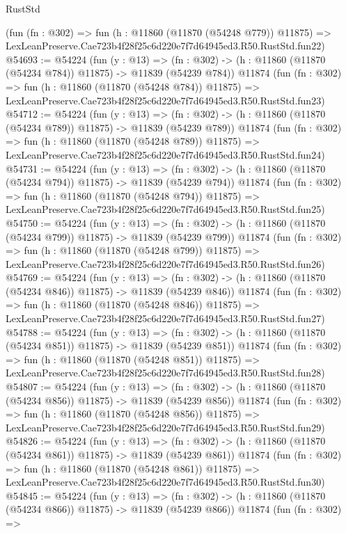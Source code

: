 \begin{lexlean}{RustStd}
\begin{coremodule}
    (fun (fn : @302) =>
    fun (h : @11860 (@11870 (@54248 @779)) @11875) =>
    LexLeanPreserve.Cae723b4f28f25c6d220e7f7d64945ed3.R50.RustStd.fun22)
@54693 := @54224
    (fun (y : @13) =>
    (fn : @302) -> (h : @11860 (@11870 (@54234 @784)) @11875) -> @11839 (@54239 @784))
    @11874
    (fun (fn : @302) =>
    fun (h : @11860 (@11870 (@54248 @784)) @11875) =>
    LexLeanPreserve.Cae723b4f28f25c6d220e7f7d64945ed3.R50.RustStd.fun23)
@54712 := @54224
    (fun (y : @13) =>
    (fn : @302) -> (h : @11860 (@11870 (@54234 @789)) @11875) -> @11839 (@54239 @789))
    @11874
    (fun (fn : @302) =>
    fun (h : @11860 (@11870 (@54248 @789)) @11875) =>
    LexLeanPreserve.Cae723b4f28f25c6d220e7f7d64945ed3.R50.RustStd.fun24)
@54731 := @54224
    (fun (y : @13) =>
    (fn : @302) -> (h : @11860 (@11870 (@54234 @794)) @11875) -> @11839 (@54239 @794))
    @11874
    (fun (fn : @302) =>
    fun (h : @11860 (@11870 (@54248 @794)) @11875) =>
    LexLeanPreserve.Cae723b4f28f25c6d220e7f7d64945ed3.R50.RustStd.fun25)
@54750 := @54224
    (fun (y : @13) =>
    (fn : @302) -> (h : @11860 (@11870 (@54234 @799)) @11875) -> @11839 (@54239 @799))
    @11874
    (fun (fn : @302) =>
    fun (h : @11860 (@11870 (@54248 @799)) @11875) =>
    LexLeanPreserve.Cae723b4f28f25c6d220e7f7d64945ed3.R50.RustStd.fun26)
@54769 := @54224
    (fun (y : @13) =>
    (fn : @302) -> (h : @11860 (@11870 (@54234 @846)) @11875) -> @11839 (@54239 @846))
    @11874
    (fun (fn : @302) =>
    fun (h : @11860 (@11870 (@54248 @846)) @11875) =>
    LexLeanPreserve.Cae723b4f28f25c6d220e7f7d64945ed3.R50.RustStd.fun27)
@54788 := @54224
    (fun (y : @13) =>
    (fn : @302) -> (h : @11860 (@11870 (@54234 @851)) @11875) -> @11839 (@54239 @851))
    @11874
    (fun (fn : @302) =>
    fun (h : @11860 (@11870 (@54248 @851)) @11875) =>
    LexLeanPreserve.Cae723b4f28f25c6d220e7f7d64945ed3.R50.RustStd.fun28)
@54807 := @54224
    (fun (y : @13) =>
    (fn : @302) -> (h : @11860 (@11870 (@54234 @856)) @11875) -> @11839 (@54239 @856))
    @11874
    (fun (fn : @302) =>
    fun (h : @11860 (@11870 (@54248 @856)) @11875) =>
    LexLeanPreserve.Cae723b4f28f25c6d220e7f7d64945ed3.R50.RustStd.fun29)
@54826 := @54224
    (fun (y : @13) =>
    (fn : @302) -> (h : @11860 (@11870 (@54234 @861)) @11875) -> @11839 (@54239 @861))
    @11874
    (fun (fn : @302) =>
    fun (h : @11860 (@11870 (@54248 @861)) @11875) =>
    LexLeanPreserve.Cae723b4f28f25c6d220e7f7d64945ed3.R50.RustStd.fun30)
@54845 := @54224
    (fun (y : @13) =>
    (fn : @302) -> (h : @11860 (@11870 (@54234 @866)) @11875) -> @11839 (@54239 @866))
    @11874
    (fun (fn : @302) =>

\end{coremodule}
\end{lexlean}
